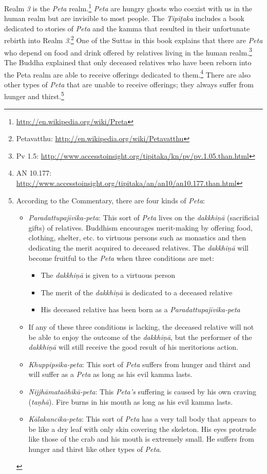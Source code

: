 Realm \textit{3} is the \textit{Peta} realm.\footnote{\url{http://en.wikipedia.org/wiki/Preta}} \textit{Peta} are hungry ghosts who coexist with us in the human realm but are invisible to most people. The \textit{Tipiṭaka} includes a book dedicated to stories of \textit{Peta} and the kamma that resulted in their unfortunate rebirth into Realm \textit{3}.\footnote{Petavatthu: \url{http://en.wikipedia.org/wiki/Petavatthu}} One of the Suttas in this book explains that there are \textit{Peta} who depend on food and drink offered by relatives living in the human realm.\footnote{Pv 1.5: \url{http://www.accesstoinsight.org/tipitaka/kn/pv/pv.1.05.than.html}} The Buddha explained that only deceased relatives who have been reborn into the Peta realm are able to receive offerings dedicated to them.\footnote{AN 10.177: \url{http://www.accesstoinsight.org/tipitaka/an/an10/an10.177.than.html}} There are also other types of \textit{Peta} that are unable to receive offerings; they always suffer from hunger and thirst.\footnote{According to the Commentary, there are four kinds of \textit{Peta}: 

\begin{itemize}[nosep]
\item \textit{Paradattupajīvika-peta}: This sort of \textit{Peta} lives on the \textit{dakkhiṇā} (sacrificial gifts) of relatives. Buddhism encourages merit-making by offering food, clothing, shelter, etc. to virtuous persons such as monastics and then dedicating the merit acquired to deceased relatives. The \textit{dakkhiṇā} will become fruitful to the \textit{Peta} when three conditions are met:
\begin{itemize}[nosep]
\item The \textit{dakkhiṇā} is given to a virtuous person
\item The merit of the \textit{dakkhiṇā} is dedicated to a deceased relative
\item His deceased relative has been born as a \textit{Paradattupajīvika-peta}
\end{itemize}
\item [ ]If any of these three conditions is lacking, the deceased relative will not be able to enjoy the outcome of the \textit{dakkhiṇā}, but the performer of the \textit{dakkhiṇā} will still receive the good result of his meritorious action.
\item \textit{Khuppipsika-peta}: This sort of \textit{Peta} suffers from hunger and thirst and will suffer as a \textit{Peta} as long as his evil kamma lasts.
\item \textit{Nijjhāmataõhikā-peta}: This \textit{Peta’s} suffering is caused by his own craving (\textit{taṇhā}). Fire burns in his mouth as long as his evil kamma lasts.
\item \textit{Kālakancika-peta}: This sort of \textit{Peta} has a very tall body that appears to be like a dry leaf with only skin covering the skeleton. His eyes protrude like those of the crab and his mouth is extremely small. He suffers from hunger and thirst like other types of \textit{Peta}. 
\vspace{-4mm}
\end{itemize}
}


